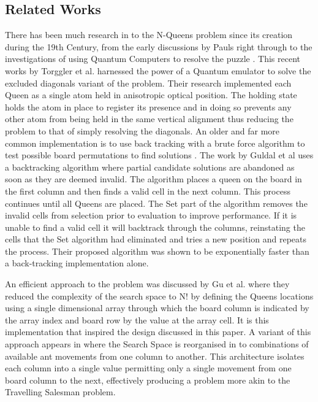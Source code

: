 \documentclass[conference]{IEEEtran}
\begin{document}
\subsection{Related Works}
There has been much research in to the N-Queens problem since its creation during the 19th Century, from the early discussions by Pauls \cite{Pauls} right through to the investigations of using Quantum Computers to resolve the puzzle \cite{Quantum}. This recent works by Torggler et al. harnessed the power of a Quantum emulator to solve the excluded diagonals variant of the problem. Their research implemented each Queen as a single atom held in anisotropic optical position. The holding state holds the atom in place to register its presence and in doing so prevents any other atom from being held in the same vertical alignment thus reducing the problem to that of simply resolving the diagonals. 
An older and far more common implementation is to use back tracking with a brute force algorithm to test possible board permutations to find solutions \cite{Performance}\cite{Backtracking} \cite{Guldal}. The work by Guldal et al uses a backtracking algorithm where partial candidate solutions are abandoned as soon as they are deemed invalid. The algorithm places a queen on the board in the first column and then finds a valid cell in the next column. This process continues until all Queens are placed. The Set part of the algorithm removes the invalid cells from selection prior to evaluation to improve performance.
If it is unable to find a valid cell it will backtrack through the columns, reinstating the cells that the Set algorithm had eliminated and tries a new position and repeats the process. Their proposed algorithm was shown to be exponentially faster than a back-tracking implementation alone.

An efficient approach to the problem was discussed by Gu et al. \cite{Polynomial} where they reduced the complexity of the search space to N! by defining the Queens locations using a single dimensional array through which the board column is indicated by the array index and board row by the value at the array cell. It is this implementation that inspired the design discussed in this paper. A variant of this approach appears in \cite{ACO} where the Search Space is reorganised in to combinations of available ant movements from one column to another. This architecture isolates each column into a single value permitting only a single movement from one board column to the next, effectively producing a problem more akin to the Travelling Salesman problem.
\end{document}
